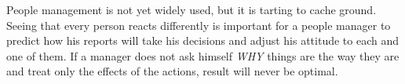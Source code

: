 People management is not yet widely used, but it is tarting to cache ground. Seeing that every person reacts differently is important for a people manager to predict how his reports will take his decisions and adjust his attitude to each and one of them. If a manager does not ask himself \textit{WHY} things are the way they are and treat only the effects of the actions, result will never be optimal.